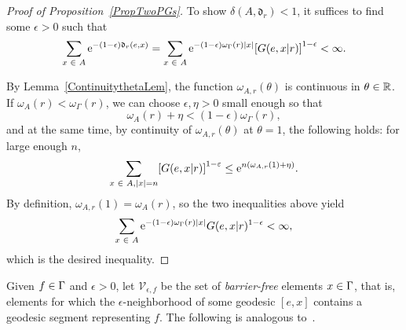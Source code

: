 \documentclass[10pt]{amsart}
\theoremstyle{definition}\newtheorem{defi}[theo]{Definition}\newtheorem{rema}[theo]{Remark}\newtheorem{exam}[theo]{Example}\newtheorem{exem}[theo]{Example}\newtheorem{nota}[theo]{Notation}
\newcommand{\R}{\mathbb{R}}
\newcommand{\rme}{\mathrm{e}}
\newcommand{\fkd}{\mathfrak{d}}
\newcommand{\clV}{\mathcal{V}}
\let\originalleft\left
\let\originalright\right
\renewcommand{\left}{\mathopen{}\mathclose\bgroup\originalleft}
\renewcommand{\right}{\aftergroup\egroup\originalright}
\let\oldin\in
\renewcommand{\in}{\mathchoice{\oldin}{\oldin}{\,\oldin\,}{\,\oldin\,}}
\begin{document}
\begin{proof}[Proof of Proposition~\ref{PropTwoPGs}]
To show $\delta(A,\fkd_r)<1$, it suffices to find some $\epsilon > 0$ such that
\[
\sum_{x \in A} \rme^{- (1 - \epsilon) \fkd_r(e, x)} = \sum_{x \in A} \rme^{- (1 - \epsilon) \omega_{\Gamma}(r) |x|} \left[G(e, x | r) \right]^{1 - \epsilon} < \infty.
\]



By Lemma~\ref{ContinuitythetaLem}, the function $\omega_{A,r}(\theta)$ is continuous in $\theta\in\R$. If $\omega_A(r) < \omega_{\Gamma}(r)$, we can choose $\epsilon,\eta>0$ small enough so that
\[
\omega_A(r) + \eta < (1 - \epsilon) \omega_{\Gamma}(r),
\]
and at the same time, by continuity of $\omega_{A,r}(\theta)$ at $\theta=1$, the following holds: for large enough $n$,
\[
\sum_{x \in A, |x| = n} \left[G(e, x | r) \right]^{1 - \varepsilon} \leq \rme^{n \left(\omega_{A,r}(1) + \eta \right)}.
\]
By definition, $\omega_{A,r}(1)=\omega_A(r)$, so the two inequalities above yield
\[
\sum_{x \in A} \rme^{- (1 - \epsilon) \omega_{\Gamma}(r) |x|} G(e, x | r)^{1-\epsilon} < \infty,
\]
which is the desired inequality.
\end{proof}

Given $f\in \Gamma$ and $\epsilon>0$, let $\clV_{\epsilon, f}$ be the set of \emph{barrier-free} elements $x\in \Gamma$, that is, elements for which the $\epsilon$-neighborhood of some geodesic $[e,x]$ contains a geodesic segment representing $f$. The following is analogous to~\cite[Theorem~C]{YangSCC}.
\end{document}
